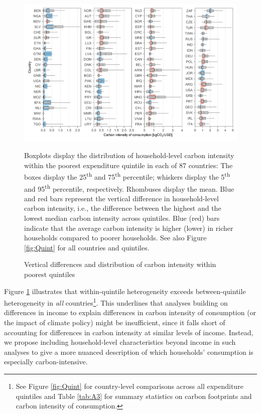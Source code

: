 \documentclass[12pt, a4paper]{article}
\newenvironment{subcaption2}
{\strut
\vspace{-5pt}
\begin{minipage}[b]{0.9\textwidth}
  \hspace*{-\parindent}
  \footnotesize}
 {\end{minipage}}
\begin{document}
\begin{figure}[ht!]
    \centering
    \includegraphics{Figure 1/Figure_1_2017}
    \caption{Vertical differences and distribution of carbon intensity within poorest quintiles}
    \label{fig:fig_1}
    \begin{subcaption2}
    Boxplots display the distribution of household-level carbon intensity within the poorest expenditure quintile in each of 87 countries: The boxes display the 25\textsuperscript{th} and 75\textsuperscript{th} percentile; whiskers display the 5\textsuperscript{th} and 95\textsuperscript{th} percentile, respectively. Rhombuses display the mean. Blue and red bars represent the vertical difference in household-level carbon intensity, i.e., the difference between the highest and the lowest median carbon intensity across quintiles. Blue (red) bars indicate that the average carbon intensity is higher (lower) in richer households compared to poorer households. See also Figure \ref{fig:Quint} for all countries and quintiles.
    \end{subcaption2}
\end{figure}

Figure \ref{fig:fig_1} illustrates that within-quintile heterogeneity exceeds between-quintile heterogeneity in \textit{all} countries\footnote{See Figure \ref{fig:Quint} for country-level comparisons across all expenditure quintiles and Table \ref{tab:A3} for summary statistics on carbon footprints and carbon intensity of consumption.}. This underlines that analyses building on differences in income to explain differences in carbon intensity of consumption (or the impact of climate policy) might be insufficient, since it falls short of accounting for differences in carbon intensity at similar levels of income. Instead, we propose including household-level characteristics beyond income in such analyses to give a more nuanced description of which households' consumption is especially carbon-intensive.
\end{document}
